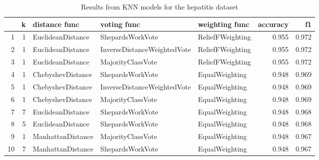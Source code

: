 \begin{table}
\centering
\caption{Results from KNN models for the hepatitis dataset}
\begin{tabular}{rrlllrr}
\toprule
 & k & distance func & voting func & weighting func & accuracy & f1 \\
\midrule
1 & 1 & EuclideanDistance & ShepardsWorkVote & ReliefFWeighting & 0.955 & 0.972 \\
2 & 1 & EuclideanDistance & InverseDistanceWeightedVote & ReliefFWeighting & 0.955 & 0.972 \\
3 & 1 & EuclideanDistance & MajorityClassVote & ReliefFWeighting & 0.955 & 0.972 \\
4 & 1 & ChebyshevDistance & ShepardsWorkVote & EqualWeighting & 0.948 & 0.969 \\
5 & 1 & ChebyshevDistance & InverseDistanceWeightedVote & EqualWeighting & 0.948 & 0.969 \\
6 & 1 & ChebyshevDistance & MajorityClassVote & EqualWeighting & 0.948 & 0.969 \\
7 & 7 & EuclideanDistance & ShepardsWorkVote & EqualWeighting & 0.948 & 0.968 \\
8 & 5 & EuclideanDistance & ShepardsWorkVote & EqualWeighting & 0.948 & 0.968 \\
9 & 1 & ManhattanDistance & MajorityClassVote & EqualWeighting & 0.948 & 0.967 \\
10 & 7 & ManhattanDistance & ShepardsWorkVote & EqualWeighting & 0.948 & 0.967 \\
\bottomrule
\end{tabular}
\end{table}
